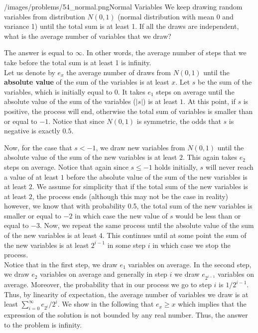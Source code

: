 \begin{problem}{/images/problems/54_normal.png}{Normal Variables}  We keep drawing random variables from distribution $N(0,1)$ (normal distribution with mean 0 and variance 1) until the total sum is at least 1. If all the draws are independent, what is the average number of variables that we draw?
\end{problem}
\begin{solution}
The answer is equal to $\infty$. In other words, the average number of steps that we take before the total sum is at least 1 is infinity.\\[0.2cm]

Let us denote by $e_x$ the average number of draws from $N(0,1)$ until the \textbf{absolute value} of the sum of the variables is at least $x$. Let $s$ be the sum of the variables, which is initially equal to 0. It takes $e_1$ steps on average until the absolute value of the sum of the variables ($|s|$) is at least $1$. At this point, if $s$ is positive, the process will end, otherwise the total sum of variables is smaller than or equal to $-1$. Notice that since $N(0,1)$ is symmetric,  the odds that $s$ is negative is exactly $0.5$.

Now, for the case that $s< -1$, we draw new variables from $N(0,1)$ until the absolute value of the sum of the new variables is at least $2$. This again takes $e_2$ steps on average. Notice that again since $s \leq -1$ holds initially, $s$ will never reach a value of at least $1$ before the absolute value of the sum of the new variables is at least $2$. We assume for simplicity that if the total sum of the new variables is at least $2$, the process ends (although this may not be the case in reality) however, we know that with probability 0.5, the total sum of the new variables is smaller or equal to $-2 $ in which case the new value of $s$ would be less than or equal to $-3$. Now, we repeat the same process until the absolute value of the sum of the new variables is at least $4$. This continues until at some point the sum of the new variables is at least $2^{i-1}$ in some step $i$ in which case we stop the process.\\[0.2cm]

Notice that in the first step, we draw $e_1$ variables on average. In the second step, we draw $e_2$ variables on average and generally in step $i$ we draw $e_{2^{i-1}}$ variables on average. Moreover, the probability that in our process we go to step $i$ is $1/2^{i-1}$. Thus, by linearity of expectation, the average number of variables we draw is at least $\sum_{i=0}^{\infty} e_{2^i}/2^i$. We show in the following that $e_x \geq x$ which implies that the expression of the solution is not bounded by any real number. Thus, the answer to the problem is infinity.


\end{solution}
